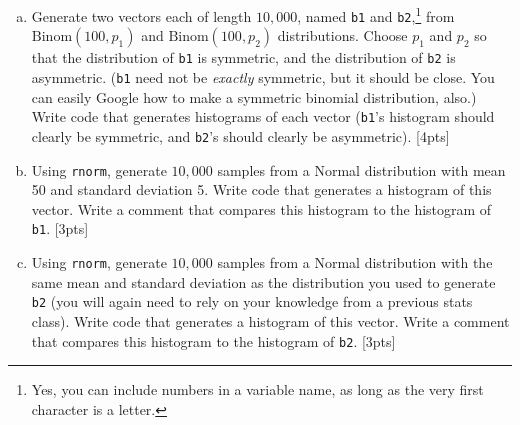 \documentclass[12pt]{article}
\newcommand{\Binom}{\text{Binom}}
\begin{document}
	\begin{enumerate}[(a)]
		\item Generate two vectors each of length $10,000$, named \verb|b1| and \verb|b2|,\footnote{Yes, you can include numbers in a variable name, as long as the very first character is a letter.} from $\Binom(100,p_1)$ and $\Binom(100,p_2)$ distributions. Choose $p_1$ and $p_2$ so that the distribution of \verb|b1| is symmetric, and the distribution of \verb|b2| is asymmetric. (\verb|b1| need not be \textit{exactly} symmetric, but it should be close. You can easily Google how to make a symmetric binomial distribution, also.) Write code that generates histograms of each vector (\verb|b1|'s histogram should clearly be symmetric, and \verb|b2|'s should clearly be asymmetric). [4pts]
		\item Using \verb|rnorm|, generate $10,000$ samples from a Normal distribution with mean 50 and standard deviation 5. Write code that generates a histogram of this vector. Write a comment that compares this histogram to the histogram of \verb|b1|. [3pts]
		\item Using \verb|rnorm|, generate $10,000$ samples from a Normal distribution with the same mean and standard deviation as the distribution you used to generate \verb|b2| (you will again need to rely on your knowledge from a previous stats class). Write code that generates a histogram of this vector. Write a comment that compares this histogram to the histogram of \verb|b2|. [3pts]
	\end{enumerate}
	
\end{document}
